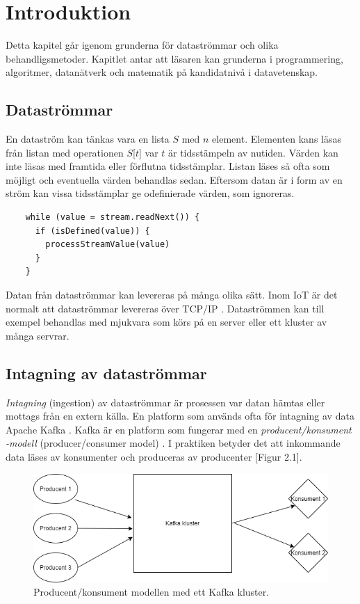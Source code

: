 \chapter{Introduktion}

Detta kapitel går igenom grunderna för dataströmmar och olika behandligsmetoder. Kapitlet antar att
läsaren kan grunderna i programmering, algoritmer, datanätverk och matematik på kandidatnivå i datavetenskap.

\section{Dataströmmar}

En dataström kan tänkas vara en lista $S$ med $n$ element. Elementen kans läsas från listan med operationen $S$[$t$] 
var $t$ är tidsstämpeln av nutiden. Värden kan inte läsas med framtida eller förflutna tidsstämplar. Listan läses
så ofta som möjligt och eventuella värden behandlas sedan. Eftersom datan är i form av en ström kan vissa 
tidsstämplar ge odefinierade värden, som ignoreras.

\begin{verbatim}
    while (value = stream.readNext()) {
      if (isDefined(value)) {
        processStreamValue(value)
      }
    }
\end{verbatim}

Datan från dataströmmar kan levereras på många olika sätt. Inom IoT är det normalt att dataströmmar 
levereras över TCP/IP \citep{shang2016challenges}. Dataströmmen kan till exempel behandlas med mjukvara som körs på en server eller ett kluster av många servrar.

\section{Intagning av dataströmmar}

\textit{Intagning} (ingestion) av dataströmmar är prosessen var datan hämtas eller mottags från en extern källa.
En platform som används ofta för intagning av data Apache Kafka \citep{marz2013big}. Kafka är en platform som fungerar med
en \textit{producent/konsument -modell} (producer/consumer model) \citep{kafka}. I praktiken betyder det att inkommande data läses av konsumenter och produceras av producenter [Figur 2.1].

\begin{figure}[h]
    \centering
    \includegraphics[scale=0.7]{img/prod-cons-model.png}
    \caption{Producent/konsument modellen med ett Kafka kluster.}
    \label{fig:mesh1}
\end{figure}

